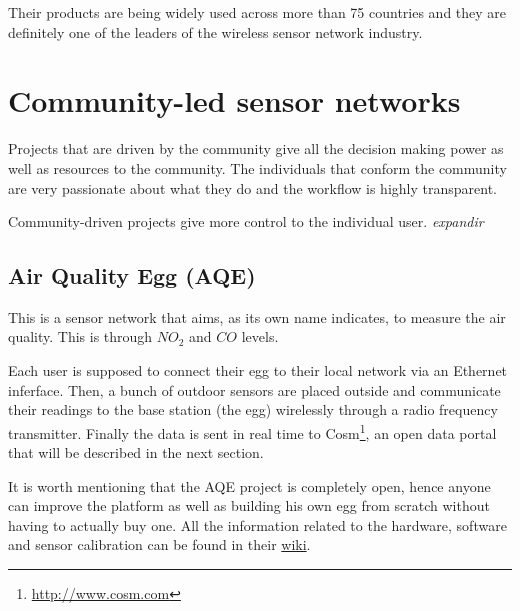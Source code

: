 Their products are being widely used across more than 75 countries and they are definitely one of the leaders of the wireless sensor network industry.



\section{Community-led sensor networks}

Projects that are driven by the community give all the decision making power as well as resources to the community. The individuals that conform the community are very passionate about what they do and the workflow is highly transparent.

Community-driven projects give more control to the individual user. \emph{expandir}

\subsection{Air Quality Egg (AQE)}

This is a sensor network that aims, as its own name indicates, to measure the air quality. This is  through $NO_{2}$ and $CO$ levels.

Each user is supposed to connect their egg to their local network via an Ethernet inferface. Then, a bunch of outdoor sensors are placed outside and communicate their readings to the base station (the egg) wirelessly through a radio frequency transmitter. Finally the data is sent in real time to Cosm\footnote{\url{http://www.cosm.com}}, an open data portal that will be described in the next section.

It is worth mentioning that the AQE project is completely open, hence anyone can improve the platform as well as building his own egg from scratch without having to actually buy one. All the information related to the hardware, software and sensor calibration can be found in their \href{http://airqualityegg.wikispaces.org}{wiki}.

